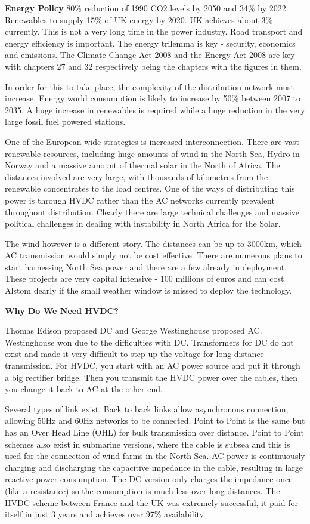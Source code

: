 \textbf{Energy Policy}
80\% reduction of 1990 CO2 levels by 2050 and 34\% by 2022. 
Renewables to supply 15\% of UK energy by 2020.
 UK achieves about 3\% currently. 
This is not a very long time in the power industry. 
Road transport and energy efficiency is important. 
The energy trilemma is key - security, economics and emissions. 
The Climate Change Act 2008 and the Energy Act 2008 are key with chapters 27 and 32 respectively being the chapters with the figures in them.

In order for this to take place, the complexity of the distribution network must increase. 
Energy world consumption is likely to increase by 50\% between 2007 to 2035. 
A huge increase in renewables is required while a huge reduction in the very large fossil fuel powered stations.

One of the European wide strategies is increased interconnection. 
There are vast renewable resources, including huge amounts of wind in the North Sea, Hydro in Norway and a massive amount of thermal solar in the North of Africa. 
The distances involved are very large, with thousands of kilometres from the renewable concentrates to the load centres. 
One of the ways of distributing this power is through HVDC rather than the AC networks currently prevalent throughout distribution. 
Clearly there are large technical challenges and massive political challenges in dealing with instability in North Africa for the Solar. 

The wind however is a different story. 
The distances can be up to 3000km, which AC transmission would simply not be cost effective. 
There are numerous plans to start harnessing North Sea power and there are a few already in deployment. 
These projects are very capital intensive - 100 millions of euros and can cost Alstom dearly if the small weather window is missed to deploy the technology.

\textbf{Why Do We Need HVDC?}

Thomas Edison proposed DC and George Westinghouse proposed AC. 
Westinghouse won due to the difficulties with DC. 
Transformers for DC do not exist and made it very difficult to step up the voltage for long distance transmission. 
For HVDC, you start with an AC power source and put it through a big rectifier bridge. 
Then you transmit the HVDC power over the cables, then you change it back to AC at the other end. 

Several types of link exist. 
Back to back links allow asynchronous connection, allowing 50Hz and 60Hz networks to be connected. 
Point to Point is the same but has an Over Head Line (OHL) for bulk transmission over distance. 
Point to Point schemes also exist in submarine versions, where the cable is subsea and this is used for the connection of wind farms in the North Sea. 
AC power is continuously charging and discharging the capacitive impedance in the cable, resulting in large reactive power consumption. 
The DC version only charges the impedance once (like a resistance) so the consumption is much less over long distances. 
The HVDC scheme between France and the UK was extremely successful, it paid for itself in just 3 years and achieves over 97\% availability. 

